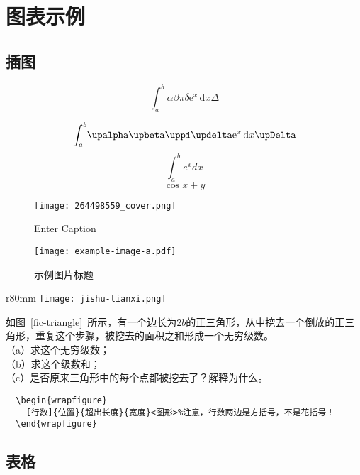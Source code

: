 
\chapter{图表示例}

\section{插图}

$$\int_a^b\!\alpha\beta\pi\delta\mathrm{e}^x\,\mathrm{d}x \Delta$$

$$\int_a^b\!\upalpha\upbeta\mpi\mdl\me^x\,\md x \upDelta$$
$$\int_a^b e^x dx$$
\[\cos x+y\]

\begin{figure}[!htbp]
    \centering
    \texttt{[image: 264498559\_cover.png]}
    \caption{Enter Caption}
    \label{fig:enter-label}
\end{figure}


\begin{figure}
  \centering
  \texttt{[image: example-image-a.pdf]}
  \caption*{国外的期刊习惯将图表的标题和说明文字写成一段，需要改写为标题只含图表的名称，其他说明文字以注释方式写在图表下方，或者写在正文中。}
  \caption{示例图片标题}
  \label{fig:example}
\end{figure}

\begin{wrapfigure}
  [7]{r}{80mm}  %
  \centering
  \texttt{[image: jishu-lianxi.png]}
  \caption{}
  \label{fic-triangle}
\end{wrapfigure}
如图~\ref{fic-triangle}~所示，有一个边长为$2b$的正三角形，从中挖去一个倒放的正三角形，重复这个步骤，被挖去的面积之和形成一个无穷级数。\\
（a）求这个无穷级数；\\
（b）求这个级数和；\\
（c）是否原来三角形中的每个点都被挖去了？解释为什么。

\begin{lstlisting}
  \begin{wrapfigure}
    [行数]{位置}{超出长度}{宽度}<图形>%注意，行数两边是方括号，不是花括号！
  \end{wrapfigure}
\end{lstlisting}

\section{表格}

